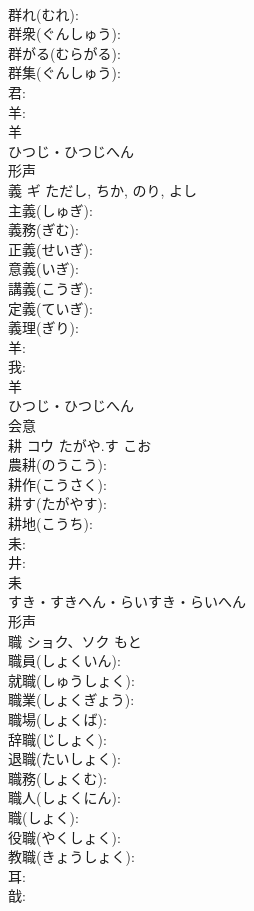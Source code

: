 \documentclass[8pt]{extreport}
\begin{document}
\begin{CJK}{UTF8}{min}
\\	群れ(むれ): 
\\	群衆(ぐんしゅう): 
\\	群がる(むらがる): 
\\	群集(ぐんしゅう): 
\\	君: 
\\	羊: 
\\	羊	
\\	ひつじ・ひつじへん	
\\	形声 
\\	義	ギ		ただし, ちか, のり, よし	
\\	主義(しゅぎ): 
\\	義務(ぎむ): 
\\	正義(せいぎ): 
\\	意義(いぎ): 
\\	講義(こうぎ): 
\\	定義(ていぎ): 
\\	義理(ぎり): 
\\	羊: 
\\	我: 
\\	羊	
\\	ひつじ・ひつじへん	
\\	会意 
\\	耕	コウ	たがや.す	こお	
\\	農耕(のうこう): 
\\	耕作(こうさく): 
\\	耕す(たがやす): 
\\	耕地(こうち): 
\\	耒: 
\\	井: 
\\	耒	
\\	すき・すきへん・らいすき・らいへん	
\\	形声 
\\	職	ショク、ソク		もと	
\\	職員(しょくいん): 
\\	就職(しゅうしょく): 
\\	職業(しょくぎょう): 
\\	職場(しょくば): 
\\	辞職(じしょく): 
\\	退職(たいしょく): 
\\	職務(しょくむ): 
\\	職人(しょくにん): 
\\	職(しょく): 
\\	役職(やくしょく): 
\\	教職(きょうしょく): 
\\	耳: 
\\	戠: 

\end{CJK}
\end{document}
